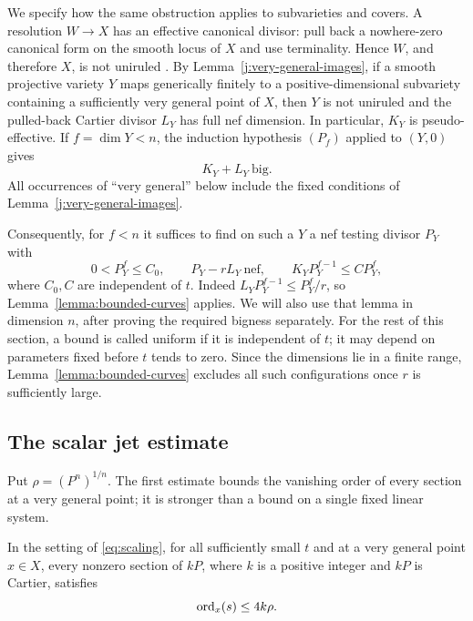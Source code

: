 We specify how the same obstruction applies to subvarieties and
covers. A resolution $W\to X$ has an effective canonical divisor:
pull back a nowhere-zero canonical form on the smooth locus of $X$
and use terminality. Hence $W$, and therefore $X$, is not uniruled
\cite{BDPP}. By Lemma~\ref{j:very-general-images}, if a smooth
projective variety $Y$ maps generically finitely to a
positive-dimensional subvariety containing a sufficiently very general
point of $X$, then $Y$ is not uniruled and the pulled-back Cartier
divisor $L_Y$ has full nef dimension. In particular, $K_Y$ is
pseudo-effective. If $f=\dim Y<n$, the induction hypothesis $(P_f)$
applied to $(Y,0)$ gives
\begin{equation}\label{j:lower-big}
                         K_Y+L_Y\ \text{big}.
\end{equation}
All occurrences of ``very general'' below include the fixed
conditions of Lemma~\ref{j:very-general-images}.

Consequently, for $f<n$ it suffices to find on such a $Y$ a nef
testing divisor $P_Y$ with
\[
 0<P_Y^f\le C_0,\qquad P_Y-rL_Y\ \text{nef},\qquad
 K_YP_Y^{f-1}\le C P_Y^f,
\]
where $C_0,C$ are independent of $t$. Indeed
$L_YP_Y^{f-1}\le P_Y^f/r$, so Lemma~\ref{lemma:bounded-curves}
applies. We will also use that lemma in dimension $n$, after proving
the required bigness separately. For the rest of this section, a
bound is called uniform if it is independent of $t$; it may depend
on parameters fixed before $t$ tends to zero. Since the dimensions
lie in a finite range, Lemma~\ref{lemma:bounded-curves} excludes all
such configurations once $r$ is sufficiently large.

\subsection{The scalar jet estimate}

Put $\rho=(P^n)^{1/n}$. The first estimate bounds the vanishing order
of every section at a very general point; it is stronger than a
bound on a single fixed linear system.

\begin{lemma}\label{lemma:scalar-bound}
In the setting of \eqref{eq:scaling}, for all sufficiently small $t$
and at a very general point $x\in X$, every nonzero section of $kP$,
where $k$ is a positive integer and $kP$ is Cartier, satisfies
\begin{equation}\label{j:scalar-order}
                         \operatorname{ord}_x(s)\le4k\rho.
\end{equation}
\end{lemma}

